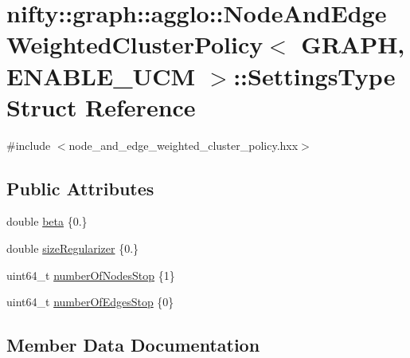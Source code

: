 \hypertarget{structnifty_1_1graph_1_1agglo_1_1NodeAndEdgeWeightedClusterPolicy_1_1SettingsType}{}\section{nifty\+:\+:graph\+:\+:agglo\+:\+:Node\+And\+Edge\+Weighted\+Cluster\+Policy$<$ G\+R\+A\+P\+H, E\+N\+A\+B\+L\+E\+\_\+\+U\+C\+M $>$\+:\+:Settings\+Type Struct Reference}
\label{structnifty_1_1graph_1_1agglo_1_1NodeAndEdgeWeightedClusterPolicy_1_1SettingsType}


{\ttfamily \#include $<$node\+\_\+and\+\_\+edge\+\_\+weighted\+\_\+cluster\+\_\+policy.\+hxx$>$}

\subsection*{Public Attributes}
\begin{DoxyCompactItemize}
\item 
double \hyperlink{structnifty_1_1graph_1_1agglo_1_1NodeAndEdgeWeightedClusterPolicy_1_1SettingsType_a9f7f74df89ee2f84bbd2537a7cd783bd}{beta} \{0.\}
\item 
double \hyperlink{structnifty_1_1graph_1_1agglo_1_1NodeAndEdgeWeightedClusterPolicy_1_1SettingsType_aca88c9142fbe9a8789c52042136f7726}{size\+Regularizer} \{0.\}
\item 
uint64\+\_\+t \hyperlink{structnifty_1_1graph_1_1agglo_1_1NodeAndEdgeWeightedClusterPolicy_1_1SettingsType_aee8176a814f59a05d6919b419c1bd16d}{number\+Of\+Nodes\+Stop} \{1\}
\item 
uint64\+\_\+t \hyperlink{structnifty_1_1graph_1_1agglo_1_1NodeAndEdgeWeightedClusterPolicy_1_1SettingsType_a881c642ddc8b43c494c24df3292ef8a1}{number\+Of\+Edges\+Stop} \{0\}
\end{DoxyCompactItemize}


\subsection{Member Data Documentation}
\hypertarget{structnifty_1_1graph_1_1agglo_1_1NodeAndEdgeWeightedClusterPolicy_1_1SettingsType_a9f7f74df89ee2f84bbd2537a7cd783bd}{}
